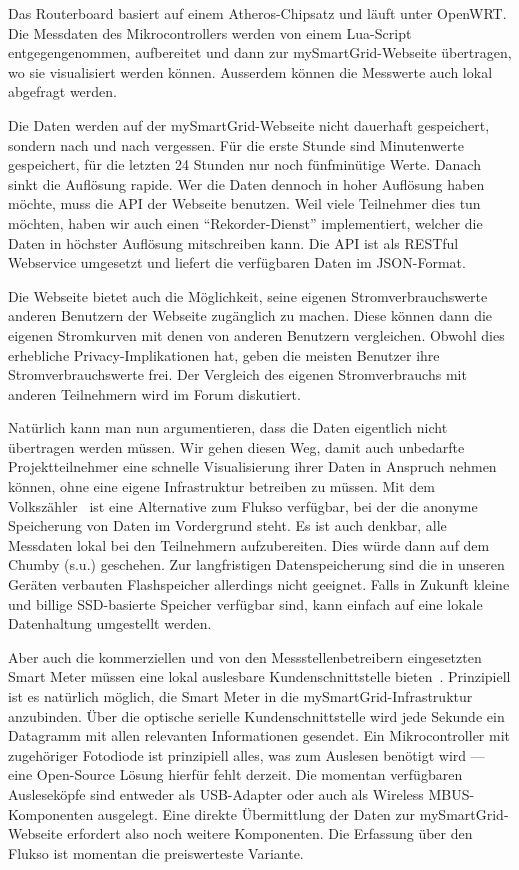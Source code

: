 \documentclass[logo]{fhgart}
\begin{document}
Das Routerboard basiert auf einem Atheros-Chipsatz und läuft unter
OpenWRT. Die Messdaten des Mikrocontrollers werden von einem Lua-Script
entgegengenommen, aufbereitet und dann zur mySmartGrid-Webseite
übertragen, wo sie visualisiert werden können. Ausserdem können die
Messwerte auch lokal abgefragt werden.

Die Daten werden auf der mySmartGrid-Webseite nicht dauerhaft
gespeichert, sondern nach und nach vergessen. Für die erste Stunde sind
Minutenwerte gespeichert, für die letzten 24 Stunden nur noch
fünfminütige Werte. Danach sinkt die Auflösung rapide. Wer die Daten
dennoch in hoher Auflösung haben möchte, muss die API der Webseite
benutzen. Weil viele Teilnehmer dies tun möchten, haben wir auch einen
"`Rekorder-Dienst"' implementiert, welcher die Daten in höchster
Auflösung mitschreiben kann. Die API ist als RESTful Webservice
umgesetzt und liefert die verfügbaren Daten im JSON-Format.

Die Webseite bietet auch die Möglichkeit, seine eigenen
Stromverbrauchswerte anderen Benutzern der Webseite zugänglich zu
machen. Diese können dann die eigenen Stromkurven mit denen von
anderen Benutzern vergleichen. Obwohl dies erhebliche
Privacy-Implikationen hat, geben die meisten Benutzer ihre
Stromverbrauchswerte frei. Der Vergleich des eigenen Stromverbrauchs mit
anderen Teilnehmern wird im Forum diskutiert.

Natürlich kann man nun argumentieren, dass die Daten eigentlich nicht
übertragen werden müssen. Wir gehen diesen Weg, damit auch unbedarfte
Projektteilnehmer eine schnelle Visualisierung ihrer Daten in Anspruch
nehmen können, ohne eine eigene Infrastruktur betreiben zu müssen. Mit
dem Volkszähler~\cite{web:volkszaehler} ist eine Alternative zum Flukso
verfügbar, bei der die anonyme Speicherung von Daten im Vordergrund
steht. Es ist auch denkbar, alle Messdaten lokal bei den
Teilnehmern aufzubereiten. Dies würde dann auf dem Chumby (s.u.)
geschehen. Zur langfristigen Datenspeicherung sind die in unseren
Geräten verbauten Flashspeicher allerdings nicht geeignet. Falls in
Zukunft kleine und billige SSD-basierte Speicher verfügbar sind, kann
einfach auf eine lokale Datenhaltung umgestellt werden.

Aber auch die kommerziellen und von den Messstellenbetreibern
eingesetzten Smart Meter müssen eine lokal auslesbare
Kundenschnittstelle bieten~\cite{bundesnetzagentur10position}. 
Prinzipiell ist es natürlich möglich, die Smart
Meter in die mySmartGrid-Infrastruktur anzubinden. Über die optische
serielle Kundenschnittstelle wird jede Sekunde ein Datagramm mit allen
relevanten Informationen gesendet. Ein Mikrocontroller mit zugehöriger
Fotodiode ist prinzipiell alles, was zum Auslesen benötigt wird --- eine
Open-Source Lösung hierfür fehlt derzeit.
Die momentan verfügbaren Ausleseköpfe sind entweder als
USB-Adapter oder auch als Wireless MBUS-Komponenten ausgelegt. Eine
direkte Übermittlung der Daten zur mySmartGrid-Webseite erfordert also
noch weitere Komponenten. Die Erfassung über den Flukso ist momentan die
preiswerteste Variante.
\end{document}
